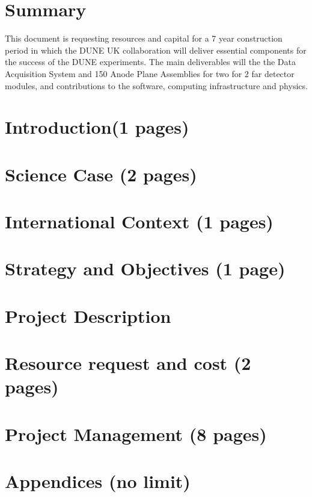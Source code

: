 \documentclass[a4paper,11pt]{article}
\begin{document}
\section*{Summary}
This document is requesting resources and capital for a 7 year construction period in which the DUNE UK collaboration will deliver essential components for the success of the DUNE experiments. The main deliverables will the the Data Acquisition System and 150 Anode Plane Assemblies for two for 2 far detector modules, and contributions to the software, computing infrastructure and physics.

\thispagestyle{empty}

\newpage
\thispagestyle{empty}
\setcounter{page}{1}

\setcounter{tocdepth}{2}
\tableofcontents
\newpage


\section{Introduction(1 pages)} 


\section{Science Case (2 pages)}


\section{International Context (1 pages)}


\section{Strategy and Objectives (1 page)}


\section{Project Description}





\section{Resource request and cost (2 pages)}

%
\section{Project Management (8 pages)}


\printbibliography
\clearpage


\appendix
\section*{Appendices (no limit)}
\renewcommand{\thesubsection}{\Alph{subsection}}


\end{document}
